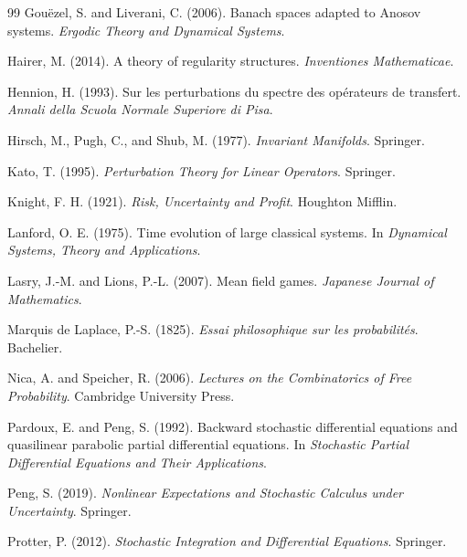 \documentclass[12pt, letterpaper]{amsart}
\theoremstyle{plain}
\theoremstyle{definition}
\theoremstyle{remark}
\begin{document}
\begin{thebibliography}{99}
Gou\"ezel, S. and Liverani, C. (2006).
\newblock Banach spaces adapted to Anosov systems.
\newblock \emph{Ergodic Theory and Dynamical Systems}.

Hairer, M. (2014).
\newblock A theory of regularity structures.
\newblock \emph{Inventiones Mathematicae}.

Hennion, H. (1993).
\newblock Sur les perturbations du spectre des op\'erateurs de transfert.
\newblock \emph{Annali della Scuola Normale Superiore di Pisa}.

Hirsch, M., Pugh, C., and Shub, M. (1977).
\newblock \emph{Invariant Manifolds}.
\newblock Springer.

Kato, T. (1995).
\newblock \emph{Perturbation Theory for Linear Operators}.
\newblock Springer.

Knight, F. H. (1921).
\newblock \emph{Risk, Uncertainty and Profit}.
\newblock Houghton Mifflin.

Lanford, O. E. (1975).
\newblock Time evolution of large classical systems.
\newblock In \emph{Dynamical Systems, Theory and Applications}.

Lasry, J.-M. and Lions, P.-L. (2007).
\newblock Mean field games.
\newblock \emph{Japanese Journal of Mathematics}.

Marquis de Laplace, P.-S. (1825).
\newblock \emph{Essai philosophique sur les probabilit\'es}.
\newblock Bachelier.

Nica, A. and Speicher, R. (2006).
\newblock \emph{Lectures on the Combinatorics of Free Probability}.
\newblock Cambridge University Press.

Pardoux, E. and Peng, S. (1992).
\newblock Backward stochastic differential equations and quasilinear parabolic partial differential equations.
\newblock In \emph{Stochastic Partial Differential Equations and Their Applications}.

Peng, S. (2019).
\newblock \emph{Nonlinear Expectations and Stochastic Calculus under Uncertainty}.
\newblock Springer.

Protter, P. (2012).
\newblock \emph{Stochastic Integration and Differential Equations}.
\newblock Springer.


\end{thebibliography}
\end{document}
